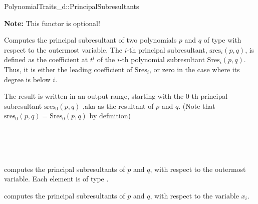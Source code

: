 \begin{ccRefConcept}{PolynomialTraits_d::PrincipalSubresultants}

\textbf{Note:} This functor is optional!

\ccDefinition

Computes the principal subresultant of two polynomials $p$ and $q$ of 
type  
with respect to the outermost variable.
The $i$-th principal subresultant, $\mathrm{sres}_i(p,q)$,
is defined as the coefficient at $t^i$ of the $i$-th polynomial
subresultant $\mathrm{Sres}_i(p,q)$. Thus, it is either the leading
coefficient of $\mathrm{Sres}_i$, or zero in the case where its degree is 
below $i$.

The result is written in an output range, starting with the $0$-th 
principal subresultant $\mathrm{sres}_0(p,q)$
,aka as the resultant of $p$ and $q$.
(Note that $\mathrm{sres}_0(p,q)=\mathrm{Sres}_0(p,q)$ by definition)

\ccRefines 
{}\\
\\
\\


\ccOperations
{}
         { computes the principal subresultants of $p$ and $q$, 
           with respect to the outermost variable. Each element is of type
           .}

         { computes the principal subresultants of $p$ and $q$, 
           with respect to the variable $x_i$.}


\ccSeeAlso

\\
\\
\\
\\
\\

\end{ccRefConcept}
